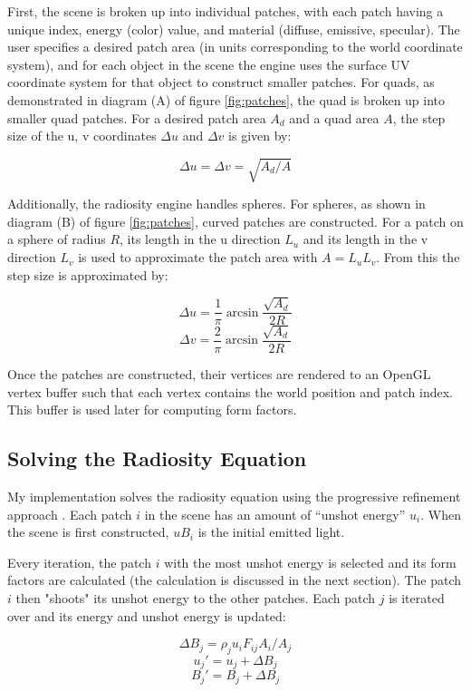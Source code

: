 \documentclass[sigconf]{acmart}
\begin{document}
First, the scene is broken up into individual patches, with each patch having a unique index, energy (color) value, and material (diffuse, emissive, specular). The user specifies a desired patch area (in units corresponding to the world coordinate system), and for each object in the scene the engine uses the surface UV coordinate system for that object to construct smaller patches. For quads, as demonstrated in diagram (A) of figure \ref{fig:patches}, the quad is broken up into smaller quad patches. For a desired patch area $A_d$ and a quad area $A$, the step size of the u, v coordinates $\Delta u$ and $\Delta v$ is given by:

\[\Delta u = \Delta v = \sqrt{A_d/A}\]

Additionally, the radiosity engine handles spheres. For spheres, as shown in diagram (B) of figure \ref{fig:patches}, curved patches are constructed. For a patch on a sphere of radius $R$, its length in the u direction $L_u$ and its length in the v direction $L_v$ is used to approximate the patch area with $A = L_u L_v$. From this the step size is approximated by:

\[\Delta u = \frac{1}{\pi} \arcsin{\frac{\sqrt{A_d}}{2 R}}\]
\[\Delta v = \frac{2}{\pi} \arcsin{\frac{\sqrt{A_d}}{2 R}}\]

Once the patches are constructed, their vertices are rendered to an OpenGL vertex buffer such that each vertex contains the world position and patch index. This buffer is used later for computing form factors.

\subsection{Solving the Radiosity Equation}

My implementation solves the radiosity equation using the progressive refinement approach \cite{progref}. Each patch $i$ in the scene has an amount of ``unshot energy'' $u_i$. When the scene is first constructed, $u B_i$ is the initial emitted light. 

Every iteration, the patch $i$ with the most unshot energy is selected and its form factors are calculated (the calculation is discussed in the next section). The patch $i$ then "shoots" its unshot energy to the other patches. Each patch $j$ is iterated over and its energy and unshot energy is updated:

\[ \Delta B_j = {\rho}_j u_i F_{ij} A_i/A_j\]
\[u_j' = u_j + \Delta B_j\]
\[B_j' = B_j + \Delta B_j\]
\end{document}
